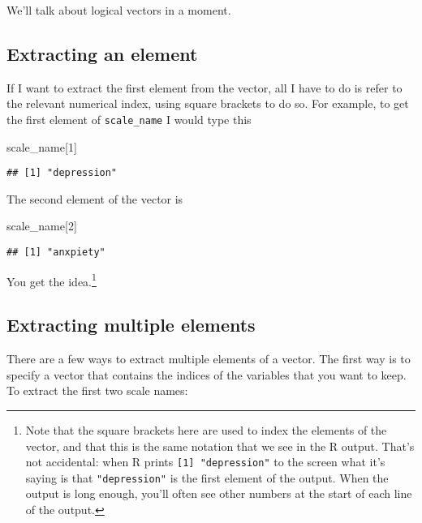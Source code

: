 \documentclass[]{book}
\newenvironment{Shaded}{\begin{snugshade}}{\end{snugshade}}
\newcommand{\DecValTok}[1]{\textcolor[rgb]{0.00,0.00,0.81}{#1}}
\newcommand{\NormalTok}[1]{#1}
\let\rmarkdownfootnote\footnote%
\def\footnote{\protect\rmarkdownfootnote}
\begin{document}
We'll talk about logical vectors in a moment.

\hypertarget{extracting-an-element}{%
\subsection{Extracting an element}\label{extracting-an-element}}

If I want to extract the first element from the vector, all I have to do is refer to the relevant numerical index, using square brackets to do so. For example, to get the first element of \texttt{scale\_name} I would type this

\begin{Shaded}
\begin{Highlighting}[]
\NormalTok{scale_name[}\DecValTok{1}\NormalTok{]}
\end{Highlighting}
\end{Shaded}

\begin{verbatim}
## [1] "depression"
\end{verbatim}

The second element of the vector is

\begin{Shaded}
\begin{Highlighting}[]
\NormalTok{scale_name[}\DecValTok{2}\NormalTok{]}
\end{Highlighting}
\end{Shaded}

\begin{verbatim}
## [1] "anxpiety"
\end{verbatim}

You get the idea.\footnote{Note that the square brackets here are used to index the elements of the vector, and that this is the same notation that we see in the R output. That's not accidental: when R prints \texttt{{[}1{]}\ "depression"} to the screen what it's saying is that \texttt{"depression"} is the first element of the output. When the output is long enough, you'll often see other numbers at the start of each line of the output.}

\hypertarget{extracting-multiple-elements}{%
\subsection{Extracting multiple elements}\label{extracting-multiple-elements}}

There are a few ways to extract multiple elements of a vector. The first way is to specify a vector that contains the indices of the variables that you want to keep. To extract the first two scale names:
\end{document}
